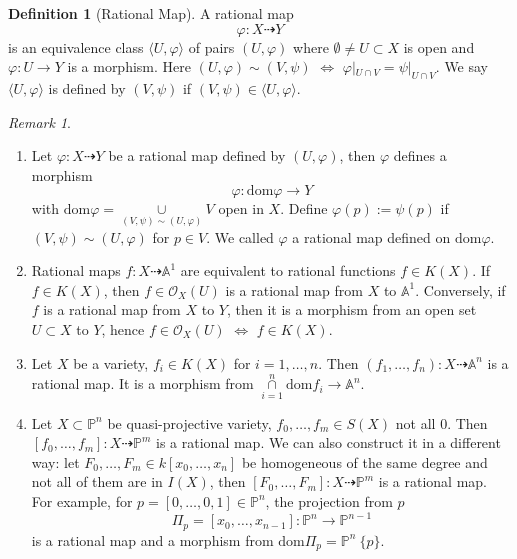 \documentclass{amsart}
\theoremstyle{plain}
\theoremstyle{definition}
\newtheorem{definition}{Definition}
\theoremstyle{remark}
\newtheorem*{remark}{Remark}
\numberwithin{equation}{section}
\begin{document}
\begin{definition}[Rational Map]
	A rational map 
$$
		\varphi:X\dashrightarrow Y
$$
	is an equivalence class $ \langle U,\varphi\rangle $ of pairs $ (U,\varphi) $ where $ \emptyset\neq U\subset X $ is open and $ \varphi :U\to Y $ is a morphism. Here $ (U,\varphi)\sim(V,\psi) $ $ \Leftrightarrow $ $ \varphi|_{U\cap V}=\psi|_{U\cap V} $. We say $ \langle U,\varphi\rangle $ is defined by $ (V,\psi) $ if $ (V,\psi)\in \langle U,\varphi\rangle $.
\end{definition}
\begin{remark}
	\noindent\begin{enumerate}
		\item 	Let $ \varphi:X\dashrightarrow Y $ be a rational map defined by $ (U,\varphi) $, then $ \varphi $ defines a morphism 
		$$
		\varphi:\text{dom}\varphi\to Y
		$$
		with $ \text{dom}\varphi=\mathop{\cup}\limits_{(V,\psi)\sim(U,\varphi)} V $ open in $ X $. Define $ \varphi(p):=\psi(p) $ if $ (V,\psi)\sim(U,\varphi) $ for $ p\in V $. We called $ \varphi $ a rational map defined on $ \text{dom}\varphi $.
		\item  Rational maps $ f:X\dashrightarrow \mathbb{A}^1 $ are equivalent to  rational functions $ f\in K(X) $. If $ f\in K(X) $, then $ f\in \mathcal{O}_X(U) $ is a rational map from $ X $ to $ \mathbb{A}^1 $. Conversely, if $ f $ is a rational map from $ X $ to $ Y $, then it is a morphism from an open set $ U\subset X $ to $ Y $, hence $ f\in \mathcal{O}_X(U) $ $ \Leftrightarrow $ $ f\in K(X) $.
		\item Let $ X $ be a variety, $ f_i\in K(X) $ for  $ i=1,\dots,n $. Then $ (f_1,\dots,f_n):X\dashrightarrow \mathbb{A}^n $ is a rational map. It is a morphism from $ \mathop{\cap}\limits_{i=1}^{n}\text{dom}f_i\to \mathbb{A}^n $.
		\item Let $ X\subset \mathbb{P}^n $ be quasi-projective variety, $ f_0,\dots,f_m\in S(X) $ not all $ 0 $. Then $ [f_0,\dots,f_m]:X\dashrightarrow \mathbb{P}^m $ is a rational map. We can also construct it in a different way: let $ F_0,\dots,F_m\in k[x_0,\dots,x_n] $ be homogeneous of the same degree and not all of them are in $ I(X) $, then $ [F_0,\dots,F_m]:X\dashrightarrow \mathbb{P}^m $ is a rational map. For example,  for $ p=[0,\dots,0,1]\in \mathbb{P}^n $, the projection from $ p $ 
		$$
			\Pi_p=[x_0,\dots,x_{n-1}]:\mathbb{P}^n\to \mathbb{P}^{n-1}
		$$
		is a rational map and a morphism  from $ \text{dom}\Pi_p=\mathbb{P}^n\ \{ p \} $.
	\end{enumerate}
\end{remark}
\end{document}
